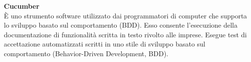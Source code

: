 \textbf{Cucumber}\\
È uno strumento software utilizzato dai programmatori di computer che supporta lo sviluppo basato sul comportamento (BDD). Esso consente l'esecuzione della documentazione di funzionalità scritta in testo rivolto alle imprese. Esegue test di accettazione automatizzati scritti in uno stile di sviluppo basato sul comportamento (Behavior-Driven Development, BDD). \\ \\
\clearpage
